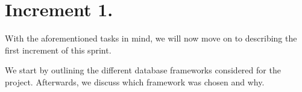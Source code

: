 \section{Increment 1.}
With the aforementioned tasks in mind, we will now move on to describing the first increment of this sprint.

We start by outlining the different database frameworks considered for the project.
Afterwards, we discuss which framework was chosen and why.





